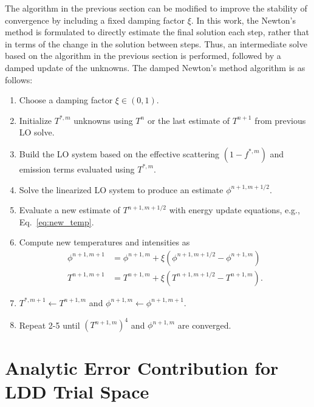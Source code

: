 The algorithm in the previous section can be modified to improve the stability of
convergence by including a fixed damping factor $\xi$.  In this work, the Newton's method is
formulated to directly estimate the final solution each step, rather that in terms of the
change in the solution between steps.  Thus, an intermediate solve based on the algorithm in the previous section is performed, followed by a damped update of the unknowns. 
The damped Newton's method algorithm is as
follows:
\begin{enumerate}
    \item Choose a damping factor $\xi\in(0,1)$.
    \item Initialize $T^{*,m}$ unknowns using $T^n$ or the last estimate of $T^{n+1}$ from
        previous LO solve.
    \item  Build the LO system based on the effective scattering $(1-f^{*,m})$ and emission terms
        evaluated using $T^{*,m}$.
    \item Solve the linearized LO system to produce an estimate $\phi^{n+1,m+1/2}$.
    \item Evaluate a new estimate of $T^{n+1,m+1/2}$ with energy update equations, e.g., Eq.~\eqref{eq:new_temp}.
    \item Compute new temperatures and intensities as
        \begin{align*}
            \phi^{n+1,m+1} &= \phi^{n+1,m}+ \xi \left( \phi^{n+1,m+1/2} - \phi^{n+1,m} \right)\\
            T^{n+1,m+1} &= T^{n+1,m}+ \xi \left( T^{n+1,m+1/2} - T^{n+1,m} \right).
           \end{align*}
       \item $T^{*,m+1}\leftarrow{T}^{n+1,m}$ and $\phi^{n+1,m} \leftarrow
           \phi^{n+1,m+1}$.
    \item Repeat 2-5 until $(T^{n+1,m})^4$ and $\phi^{n+1,m}$ are converged.
\end{enumerate}


\section{Analytic Error Contribution for LDD Trial Space}
\label{sec:face_err_deriv}

